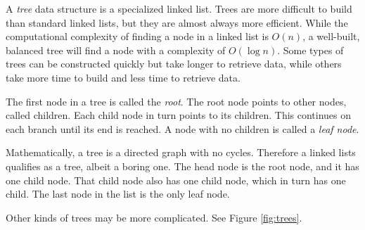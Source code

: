 A \emph{tree} data structure is a specialized linked list.
Trees are more difficult to build than standard linked lists, but they are almost always more efficient.
While the computational complexity of finding a node in a linked list is $O(n)$, a well-built, balanced tree will find a node with a complexity of $O(\log{n})$.
Some types of trees can be constructed quickly but take longer to retrieve data, while others take more time to build and less time to retrieve data.

The first node in a tree is called the \emph{root}.
The root node points to other nodes, called children.
Each child node in turn points to its children.
This continues on each branch until its end is reached.
A node with no children is called a \emph{leaf node}.

Mathematically, a tree is a directed graph with no cycles.
Therefore a linked lists qualifies as a tree, albeit a boring one.
The head node is the root node, and it has one child node.
That child node also has one child node, which in turn has one child.
The last node in the list is the only leaf node.

Other kinds of trees may be more complicated.
See Figure \ref{fig:trees}.


